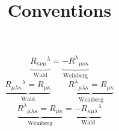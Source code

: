 \documentclass[10pt,letterpaper]{article}
\title{Conventions}
\author{}
\date{}
\begin{document}
\maketitle
\noindent 
\[
	\underbrace{ R_{\kappa\nu\mu}{}^{\lambda}}_\text{Wald} = \underbrace{-R^{\lambda}{}_{\mu\nu\kappa}}_\text{Weinberg}
\]
\[
	\underbrace{ R_{\mu\lambda\kappa}{}^{\lambda} = R_{\mu\kappa}}_\text{Wald} \qquad  \underbrace{R^{\lambda}{}_{\mu\lambda\kappa}=R_{\mu\kappa}}_\text{Weinberg}
\]
\[
	 \underbrace{R^{\lambda}{}_{\mu\lambda\kappa}=R_{\mu\kappa}}_\text{Weinberg} = \underbrace{-R_{\kappa\mu\lambda}{}^\lambda}_\text{Wald}
\]
\end{document}
